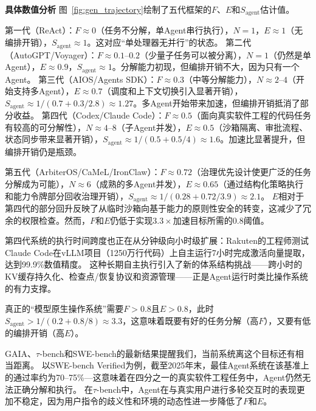\textbf{具体数值分析}
图~\ref{fig:gen_trajectory}绘制了五代框架的$F$、$E$和$S_{\mathrm{agent}}$估计值。



第一代（ReAct）：$F \approx 0$（任务不分解，单Agent串行执行），$N=1$，$E \approx 1$（无编排开销），$S_{\mathrm{agent}} \approx 1$。这对应``单处理器无并行''的状态。
第二代（AutoGPT/Voyager）：$F \approx 0.1$--$0.2$（少量子任务可以被分离），$N=1$（仍然是单Agent），$E \approx 0.9$，$S_{\mathrm{agent}} \approx 1$。分解能力初现，但编排开销不大，因为只有一个Agent。
第三代（AIOS/Agents SDK）：$F \approx 0.3$（中等分解能力），$N \approx 2$--$4$（开始支持多Agent），$E \approx 0.7$（调度和上下文切换引入显著开销），$S_{\mathrm{agent}} \approx 1/(0.7 + 0.3/2.8) \approx 1.27$。多Agent开始带来加速，但编排开销抵消了部分收益。
第四代（Codex/Claude Code）：$F \approx 0.5$（面向真实软件工程的代码任务有较高的可分解性），$N \approx 4$--$8$（子Agent并发），$E \approx 0.5$（沙箱隔离、审批流程、状态同步带来显著开销），$S_{\mathrm{agent}} \approx 1/(0.5 + 0.5/4) \approx 1.6$。加速比显著提升，但编排开销仍是瓶颈。

第五代（ArbiterOS/CaMeL/IronClaw）：$F \approx 0.72$（治理优先设计使更广泛的任务分解成为可能），$N \approx 6$（成熟的多Agent并发），$E \approx 0.65$（通过结构化策略执行和能力令牌部分回收治理开销），$S_{\mathrm{agent}} \approx 1/(0.28 + 0.72/3.9) \approx 2.1$。
$E$相对于第四代的部分回升反映了从临时沙箱向基于能力的原则性安全的转变，这减少了冗余的权限检查。然而，$F$和$E$仍低于实现$3.3\times$加速目标所需的$0.8$阈值。

第四代系统的执行时间跨度也正在从分钟级向小时级扩展：Rakuten的工程师测试Claude Code在vLLM项目（1250万行代码）上自主运行7小时完成激活向量提取，达到99.9\%数值精度\cite{anthropic2026agenticreport}。
这种长期自主执行引入了新的体系结构挑战——跨小时的KV缓存持久化、检查点/恢复协议和资源管理——正是Agent运行时类比操作系统的有力支撑。

真正的``模型原生操作系统''需要$F > 0.8$且$E > 0.8$，此时$S_{\mathrm{agent}} > 1/(0.2 + 0.8/8) \approx 3.3$，这意味着既要有好的任务分解（高$F$），又要有低的编排开销（高$E$）。

GAIA\cite{gaia2023}、$\tau$-bench\cite{taubench2024}和SWE-bench\cite{swebench2023}的最新结果提醒我们，当前系统离这个目标还有相当距离。
以SWE-bench Verified为例，截至2025年末，最佳Agent系统在该基准上的通过率约为70--75\%---这意味着在四分之一的真实软件工程任务中，Agent仍然无法正确分解和执行。
在$\tau$-bench中，Agent在与真实用户进行多轮交互时的表现更加不稳定，因为用户指令的歧义性和环境的动态性进一步降低了$F$和$E$。

